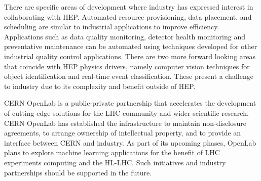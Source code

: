 There are specific areas of development where industry has expressed interest in collaborating with HEP.  Automated resource provisioning, data placement, and scheduling are similar to industrial applications to improve efficiency. Applications such as data quality monitoring, detector health monitoring and preventative maintenance can be automated using techniques developed for other industrial quality control applications. There are two more forward looking areas that coincide with HEP physics drivers, namely computer vision techniques for object identification and real-time event classification. These present a challenge to industry due to its complexity and benefit outside of HEP.


CERN OpenLab is a public-private partnership that accelerates the development of cutting-edge solutions for the LHC community and wider scientific research. CERN OpenLab has established the infrastructure to maintain non-disclosure agreements, to arrange ownership of intellectual property, and to provide an interface between CERN and industry. As part of its upcoming phases, OpenLab plans to explore machine learning applications for the benefit of LHC experiments computing and the HL-LHC. Such initiatives and industry partnerships should be supported in the future.



